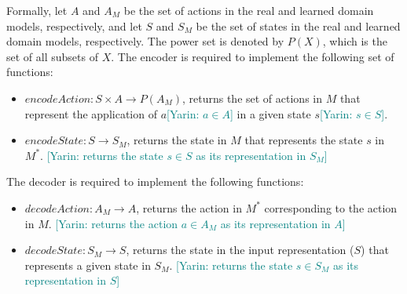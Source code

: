 \documentclass{article}
\theoremstyle{definition}
\theoremstyle{remark}
\newcommand{\realm}{\ensuremath{M^*}\xspace}
\newcommand{\yarin}[1]{{\textcolor{teal}{[Yarin: #1]}}}
\begin{document}
Formally, let $A$ and $A_M$ be the set of actions in the real and learned domain models, respectively, and let $S$ and $S_M$ be the set of states in the real and learned domain models, respectively. The power set is denoted by $P(X)$, which is the set of all subsets of $X$. 
The encoder is required to implement the following set of functions:
\begin{itemize}
    \item ${\mathit{encodeAction}: S\times A\rightarrow P(A_M)}$, returns the set of actions in $M$ that represent the application of $a$\yarin{$a \in A$} in a given state $s$\yarin{$s \in S$}. 
    \item ${\mathit{encodeState}: S\rightarrow S_M}$, returns the state in $M$ that represents the state $s$ in $\realm$. \yarin{returns the state $s \in S$ as its representation in $S_M$}
\end{itemize}
The decoder is required to implement the following functions:
\begin{itemize}
    \item ${\mathit{decodeAction}: A_M\rightarrow A}$, returns the action in $\realm$ corresponding to the action in $M$. \yarin{returns the action $a \in A_M$ as its representation in $A$}
    \item ${\mathit{decodeState}: S_M\rightarrow S}$, returns the state in the input representation ($S$) that represents a given state in $S_M$. \yarin{returns the state $s \in S_M$ as its representation in $S$}
\end{itemize}





    
    



\end{document}
